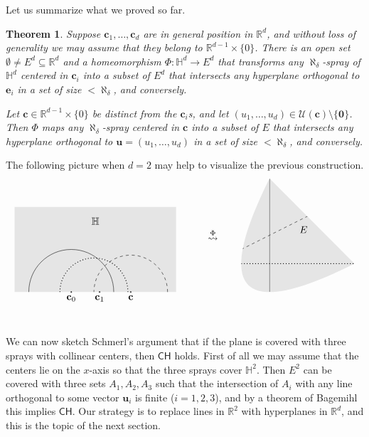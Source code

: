 \documentclass[12pt]{amsart}
\newcommand{\CH}{{\mathsf{CH}}}	%
\newcommand{\R}{\mathbb{R}}	%
\newcommand{\set}[1]{\mathopen \{ {#1} \mathclose \}} %
\theoremstyle{plain}
\newtheorem{theorem}{Theorem}[section]
\theoremstyle{definition}
\theoremstyle{remark}
\begin{document}
Let us summarize what we proved so far.

\begin{theorem}\label{th:transfer}
Suppose \( \mathbf{c}_1 , \dots , \mathbf{c}_d \) are in general position in \( \R^d \), and without loss of generality we may assume that they belong to \( \R^{d - 1} \times \set{0} \).
There is an open set \( \emptyset \neq E^d \subseteq \R^d \) and a homeomorphism \( \Phi \colon \mathbb{H}^d \to E^d \) that transforms any \( \aleph_ \delta \)-spray of \( \mathbb{H}^d \) centered in \( \mathbf{c}_i \) into a subset of \( E^d \) that intersects any hyperplane orthogonal to \( \mathbf{e}_i \) in a set of size \( < \aleph_ \delta \), and conversely. 

Let \( \mathbf{c} \in \R^{d - 1} \times \set{0} \) be distinct from the \( \mathbf{c}_i \)s, and let \( ( u_1 , \dots , u_d ) \in \mathcal{U} ( \mathbf{c} ) \setminus \set{ \mathbf{0} } \).
Then \( \Phi \) maps any \( \aleph_ \delta \)-spray centered in \( \mathbf{c} \) into a subset of \( E \) that intersects any hyperplane orthogonal to \( \mathbf{u} = ( u_1 , \dots , u_d )\) in a set of size \( < \aleph_ \delta \), and conversely.
\end{theorem}

The following picture when \( d = 2 \) may help to visualize the previous construction.
\[
\begin{tikzpicture}
\fill[gray!20] (-2,0) -- (3.7,0)--(3.7,3)--(-2,3);
\draw (1.5,0) arc [start angle=0, end angle=180, radius=1.5cm];
\draw[thick,dotted] (2,0) arc [start angle=0, end angle=180, radius=1.2cm];
\draw[dashed] (3.4,0) arc [start angle=0, end angle=180, radius=1.3cm];
\filldraw (0,0) circle [radius=0.5pt] node[anchor=north] {$\mathbf{c}_0$};
\filldraw (1,0) circle [radius=0.5pt] node[anchor=north] {$\mathbf{c}_1$};
\filldraw (2.1,0) circle [radius=0.5pt] node[anchor=north] {$\mathbf{c}$};
\node at (0.85 , 2.5) {\( \mathbb{H} \)};
\node at (5, 2) {\( \overset{\Phi}{\leadsto} \)};
\fill[gray!20] (7,4) .. controls (5,0) and (6,-1) .. (10,1) -- (7,4);
\clip (7,4) .. controls (5,0) and (6,-1) .. (10,1) -- (7,4);
\node at (8.2, 2.2) {\( E \)};
\draw[] (7,0) -- (7,4);
\draw[thick,dotted] (6,1) -- (10,1);
\draw[dashed] (6,1.5) -- (11,4);
\end{tikzpicture}
\]

We can now sketch Schmerl's argument that if the plane is covered with three sprays with collinear centers, then \( \CH \) holds.
First of all we may assume that the centers lie on the \( x \)-axis so that the three sprays cover \( \mathbb{H}^2 \).
Then \( E^2 \) can be covered with three sets \( A_1 , A_2 , A_3 \) such that the intersection of \( A_i \) with any line orthogonal to some vector \( \mathbf{u}_i \) is finite (\( i = 1 , 2 , 3 \)), and by a theorem of Bagemihl~\cite{Bagemihl:1961ve} this implies \( \CH \).
Our strategy is to replace lines in \( \R^2 \) with hyperplanes in \( \R^d \), and this is the topic of the next section.
\end{document}
